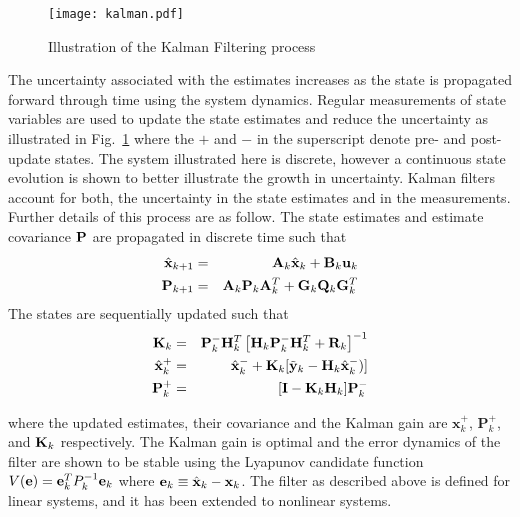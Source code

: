 \begin{figure}
	\centering
	\texttt{[image: kalman.pdf]}
	\caption{Illustration of the Kalman Filtering process}\label{fig:kalman}
\end{figure}

The uncertainty associated with the estimates increases as the state is propagated forward through time using the system dynamics. Regular measurements of state variables are used to update the state estimates and reduce the uncertainty as illustrated in Fig.~\ref{fig:kalman} where the $ + $ and $ - $ in the superscript denote pre- and post-update states. The system illustrated here is discrete, however a continuous state evolution is shown to better illustrate the growth in uncertainty. Kalman filters account for both, the uncertainty in the state estimates and in the measurements. Further details of this process are as follow. The state estimates and estimate covariance $ \P $ are propagated in discrete time such that
\begin{eqnarray}
	\hat{\x}_{k+1} &=& \A_k \hat{\x}_k + \B_k \u_k \\
	\P_{k+1} &=& \A_k\P_k \A_k^T + \mathbf{G}_k\Q_k\mathbf{G}_k^T 
\end{eqnarray}
\noindent The states are sequentially updated such that
\begin{eqnarray}
	\K_k &=& \P_k^- \H^T_k \left[\H_k \P_k^- \H^T_k + \R_k\right]^{-1} \\
	\hat{\x}_k^+ &=& \hat{\x}_k^- + \K_k[\tilde{\y}_k- \H_k \hat{\x}_k^-)] \\
	\P_k^+ &=& [\mathbf{I} - \K_k \H_k]\P_k^-
\end{eqnarray}

\noindent where the updated estimates, their covariance and the Kalman gain are $ \mathbf{x}_k^+ $, $ \mathbf{P}_k^+ $, and $ \K_k $ respectively. The Kalman gain is optimal and the error dynamics of the filter are shown to be stable \cite{Crassidis} using the Lyapunov candidate function $ V(\e) = \e_k^T P_k^{-1} \e_k $ where $ \e_k \equiv \hat{\x}_k - \x_k $. The filter as described above is defined for linear systems, and it has been extended to nonlinear systems.


